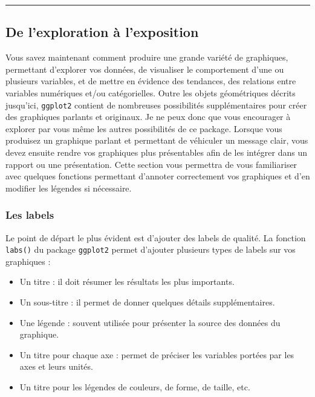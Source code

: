 \documentclass[
  a4paper,
]{article}
\providecommand{\tightlist}{%
  \setlength{\itemsep}{0pt}\setlength{\parskip}{0pt}}
\begin{document}
\begin{center}\rule{0.5\linewidth}{0.5pt}\end{center}

\hypertarget{de-lexploration-uxe0-lexposition}{%
\subsection{De l'exploration à l'exposition}\label{de-lexploration-uxe0-lexposition}}

Vous savez maintenant comment produire une grande variété de graphiques, permettant d'explorer vos données, de visualiser le comportement d'une ou plusieurs variables, et de mettre en évidence des tendances, des relations entre variables numériques et/ou catégorielles. Outre les objets géométriques décrits jusqu'ici, \texttt{ggplot2} contient de nombreuses possibilités supplémentaires pour créer des graphiques parlants et originaux. Je ne peux donc que vous encourager à explorer par vous même les autres possibilités de ce package.
Lorsque vous produisez un graphique parlant et permettant de véhiculer un message clair, vous devez ensuite rendre vos graphiques plus présentables afin de les intégrer dans un rapport ou une présentation. Cette section vous permettra de vous familiariser avec quelques fonctions permettant d'annoter correctement vos graphiques et d'en modifier les légendes si nécessaire.

\hypertarget{les-labels}{%
\subsubsection{Les labels}\label{les-labels}}

Le point de départ le plus évident est d'ajouter des labels de qualité. La fonction \texttt{labs()} du package \texttt{ggplot2} permet d'ajouter plusieurs types de labels sur vos graphiques :

\begin{itemize}
\tightlist
\item
  Un titre : il doit résumer les résultats les plus importants.
\item
  Un sous-titre : il permet de donner quelques détails supplémentaires.
\item
  Une légende : souvent utilisée pour présenter la source des données du graphique.
\item
  Un titre pour chaque axe : permet de préciser les variables portées par les axes et leurs unités.
\item
  Un titre pour les légendes de couleurs, de forme, de taille, etc.
\end{itemize}
\end{document}
